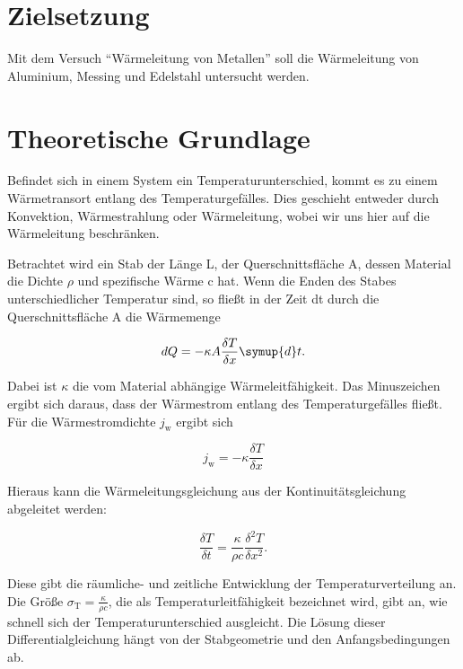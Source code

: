 \section{Zielsetzung}
    Mit dem Versuch "`Wärmeleitung von Metallen"' soll die Wärmeleitung von Aluminium, Messing und Edelstahl untersucht werden.

    \section{Theoretische Grundlage}
      Befindet sich in einem System ein Temperaturunterschied, kommt es zu einem Wärmetransort entlang des Temperaturgefälles.
      Dies geschieht entweder durch Konvektion, Wärmestrahlung oder Wärmeleitung, wobei wir uns hier auf die Wärmeleitung beschränken.

      Betrachtet wird ein Stab der Länge L, der Querschnittsfläche A, dessen Material die Dichte $\rho$ und spezifische Wärme c hat. 
      Wenn die Enden des Stabes unterschiedlicher Temperatur sind, so fließt in der Zeit dt durch die Querschnittsfläche A die Wärmemenge

      \begin{equation}
      dQ = - \kappa A \frac{\delta T}{\delta x} \symup{d}t .
        \label{eqn:waermemenge}
      \end{equation}

      Dabei ist $\kappa$ die vom Material abhängige Wärmeleitfähigkeit. 
      Das Minuszeichen ergibt sich daraus, dass der Wärmestrom entlang des Temperaturgefälles fließt.
      Für die Wärmestromdichte $j_\text{w}$ ergibt sich

      \begin{equation}
      j_\text{w}=-\kappa \frac{\delta T}{\delta x}
        \label{eqn:waermestromdichte}
      \end{equation}       
      
      Hieraus kann die Wärmeleitungsgleichung aus der Kontinuitätsgleichung abgeleitet werden:

      \begin{equation}
      \frac{\delta T}{\delta t} = \frac{\kappa}{\rho c} \frac{\delta^2 T}{\delta x^2}.
        \label{eqn:waermeleitungsgleichung}
      \end{equation}  

      Diese gibt die räumliche- und zeitliche Entwicklung der Temperaturverteilung an.
      Die Größe $\sigma_\text{T} = \frac{\kappa}{\rho c}$, 
      die als Temperaturleitfähigkeit bezeichnet wird, gibt an, wie schnell sich der Temperaturunterschied ausgleicht.
      Die Lösung dieser Differentialgleichung hängt von der Stabgeometrie und den Anfangsbedingungen ab.

